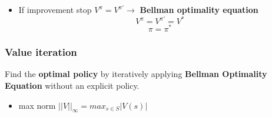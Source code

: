 \documentclass[12pt]{article} %
\begin{document}
\begin{itemize}
\item If improvement stop $V^{\pi} = V^{\pi'} \rightarrow$ \textbf{Bellman optimality equation} 
$$ V^{\pi} = V^{\pi'} = V^*$$
$$ \pi = \pi^*$$ 
\end{itemize}

\subsubsection{Value iteration}
Find the \textbf{optimal policy} by iteratively applying \textbf{Bellman Optimality Equation} without an explicit policy.

\begin{itemize}
\item 	max norm $||V||_{\infty} = max_{s \in S} |V(s)|$
\end{itemize}
\begin{center}
\end{center}

\begin{center}
\end{center}
\end{document}
